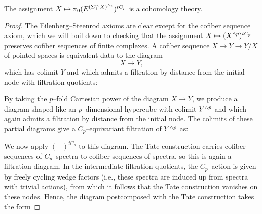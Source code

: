 \begin{lemma}\label{TateConstructionIsACohomThy}
The assignment $X \mapsto \pi_0 (E^{(\Sigma^\infty_+ X)^{\wedge p}})^{tC_p}$ is a cohomology theory.
\end{lemma}
\begin{proof}
The Eilenberg--Steenrod axioms are clear except for the cofiber sequence axiom, which we will boil down to checking that the assignment $X \mapsto (X^{\wedge p})^{tC_p}$ preserves cofiber sequences of finite complexes.  A cofiber sequence $X \to Y \to Y/X$ of pointed spaces is equivalent data to the diagram \[X \to Y,\] which has colimit $Y$ and which admits a filtration by distance from the initial node with filtration quotients:
\begin{center}
\end{center}
By taking the $p$--fold Cartesian power of the diagram $X \to Y$, we produce a diagram shaped like an $p$--dimensional hypercube with colimit $Y^{\wedge p}$ and which again admits a filtration by distance from the initial node.  The colimits of these partial diagrams give a $C_p$--equivariant filtration of $Y^{\wedge p}$ as:
\begin{center}
\end{center}
We now apply $(-)^{tC_p}$ to this diagram.  The Tate construction carries cofiber sequences of $C_p$--spectra to cofiber sequences of spectra, so this is again a filtration diagram.  In the intermediate filtration quotients, the $C_p$--action is given by freely cycling wedge factors (i.e., these spectra are induced up from spectra with trivial actions), from which it follows that the Tate construction vanishes on these nodes.  Hence, the diagram postcomposed with the Tate construction takes the form

\end{proof}
